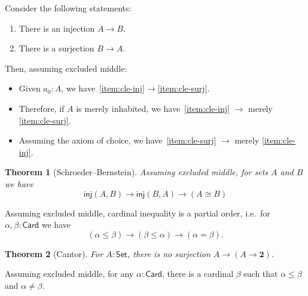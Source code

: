 \documentclass[10pt,a4paper]{article}
\providecommand{\index}[1]{}
\renewcommand{\set}{\ensuremath{\mathsf{Set}}\xspace}
\newcommand{\card}{\ensuremath{\mathsf{Card}}\xspace}
\newcommand{\bool}{\ensuremath{\mathbf{2}}\xspace}
\newcommand{\inj}{\ensuremath{\mathsf{inj}}} %
\newtheorem{thm}{Theorem}[section]
\theoremstyle{definition}
\theoremstyle{remark}
\numberwithin{equation}{section}
\begin{document}
\begin{lem}\label{thm:injsurj}
  \index{function!injective}%
  \index{function!surjective}%
  Consider the following statements:
  \begin{enumerate}
  \item There is an injection $A\to B$.\label{item:cle-inj}
  \item There is a surjection $B\to A$.\label{item:cle-surj}
  \end{enumerate}
  Then, assuming excluded middle:
  \index{excluded middle}%
  \index{axiom!of choice}%
  \begin{itemize}
  \item Given $a_0:A$, we have~\ref{item:cle-inj}$\to$\ref{item:cle-surj}.
  \item Therefore, if $A$ is merely inhabited, we have~\ref{item:cle-inj} $\to$ merely \ref{item:cle-surj}.
  \item Assuming the axiom of choice, we have~\ref{item:cle-surj} $\to$ merely \ref{item:cle-inj}.
  \end{itemize}
\end{lem}

\begin{thm}[Schroeder--Bernstein]
  \index{theorem!Schroeder--Bernstein}%
  \index{Schroeder--Bernstein theorem}%
  Assuming excluded middle, for sets $A$ and $B$ we have
  \[ \inj(A,B) \to \inj(B,A) \to (A\cong B) \]
\end{thm}

\begin{cor}
  Assuming excluded middle, cardinal inequality is a partial order, i.e.\ for $\alpha,\beta:\card$ we have
  \[ (\alpha\le\beta) \to (\beta\le\alpha) \to (\alpha=\beta). \]
\end{cor}

\begin{thm}[Cantor]
  \index{Cantor's theorem}%
  \index{theorem!Cantor's}%
  For $A:\set$, there is no surjection $A \to (A\to \bool)$.
\end{thm}

\begin{cor}
  Assuming excluded middle, for any $\alpha:\card$, there is a cardinal $\beta$ such that $\alpha\le\beta$ and $\alpha\neq\beta$.
\end{cor}
\end{document}
